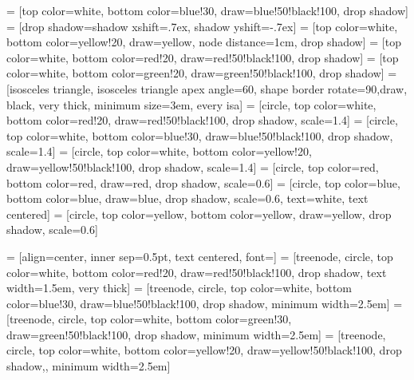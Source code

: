   \usetikzlibrary{positioning}
  \usetikzlibrary{shadows}
  \usetikzlibrary{calc}
  \usetikzlibrary{arrows}
   = [top color=white, bottom color=blue!30,
                              draw=blue!50!black!100, drop shadow]
   = [drop shadow={shadow xshift=.7ex,
                                  shadow yshift=-.7ex}]
   = [top color=white, bottom color=yellow!20,
                                draw=yellow, node distance=1cm, drop shadow]
   = [top color=white, bottom color=red!20,
                                    draw=red!50!black!100, drop shadow]
   = [top color=white, bottom color=green!20,
                          draw=green!50!black!100, drop shadow]
   = [isosceles triangle, isosceles triangle apex angle=60,
                      shape border rotate=90,draw, black, very thick, minimum size=3em, every isa]
   = [circle, top color=white, bottom color=red!20, draw=red!50!black!100, drop shadow, scale=1.4]
   = [circle, top color=white, bottom color=blue!30, draw=blue!50!black!100, drop shadow, scale=1.4]
   = [circle, top color=white, bottom color=yellow!20, draw=yellow!50!black!100, drop shadow, scale=1.4]
   =  [circle, top color=red, bottom color=red, draw=red, drop shadow, scale=0.6]
   =  [circle, top color=blue, bottom color=blue, draw=blue, drop shadow, scale=0.6, text=white, text centered]
   =  [circle, top color=yellow, bottom color=yellow, draw=yellow, drop shadow, scale=0.6]

     = [align=center, inner sep=0.5pt, text centered, font=\sffamily]
     = [treenode, circle, top color=white, bottom color=red!20,
                            draw=red!50!black!100, drop shadow, text width=1.5em, very thick]
    = [treenode, circle, top color=white, bottom color=blue!30,
                            draw=blue!50!black!100, drop shadow, minimum width=2.5em]
   = [treenode, circle, top color=white, bottom color=green!30,
                            draw=green!50!black!100, drop shadow, minimum width=2.5em]
   = [treenode, circle, top color=white, bottom color=yellow!20,
                            draw=yellow!50!black!100, drop shadow,, minimum width=2.5em]
